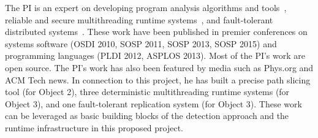 The PI is an expert on developing program analysis algorithms and 
tools~\cite{wu:pldi12, woodpecker:asplos13, repframe:apsys15}, reliable and 
secure multithreading runtime systems~\cite{smt:cacm, cui:tern:osdi10, 
peregrine:sosp11, parrot:sosp13}, and fault-tolerant distributed 
systems~\cite{crane:sosp15}. These work have been published in premier 
conferences on systems software (OSDI 2010, SOSP 2011, SOSP 2013, SOSP 2015) and 
programming languages (PLDI 2012, ASPLOS 2013). Most of the PI's work are open 
source. The PI's work has also been featured by media such as Phys.org and 
ACM Tech news. In connection to this project, he has built a precise path 
slicing tool (for Object 2), three deterministic multithreading runtime systems 
(for Object 3), and one fault-tolerant replication system (for Object 3). These 
work can be leveraged as basic building blocks of the detection approach and 
the runtime infrastructure in this proposed project.


% 


